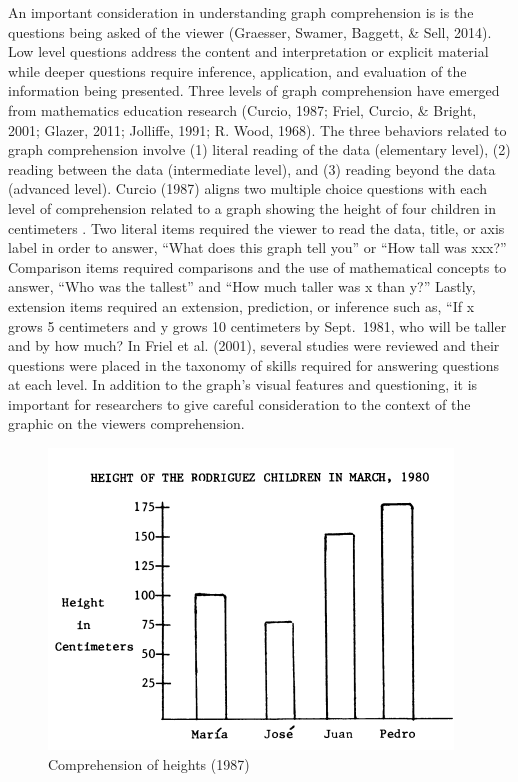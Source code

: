 \documentclass[print]{nuthesis}
\begin{document}
An important consideration in understanding graph comprehension is is the questions being asked of the viewer (Graesser, Swamer, Baggett, \& Sell, 2014).
Low level questions address the content and interpretation or explicit material while deeper questions require inference, application, and evaluation of the information being presented.
Three levels of graph comprehension have emerged from mathematics education research (Curcio, 1987; Friel, Curcio, \& Bright, 2001; Glazer, 2011; Jolliffe, 1991; R. Wood, 1968).
The three behaviors related to graph comprehension involve (1) literal reading of the data (elementary level), (2) reading between the data (intermediate level), and (3) reading beyond the data (advanced level).
Curcio (1987) aligns two multiple choice questions with each level of comprehension related to a graph showing the height of four children in centimeters .
Two literal items required the viewer to read the data, title, or axis label in order to answer, ``What does this graph tell you'' or ``How tall was xxx?''
Comparison items required comparisons and the use of mathematical concepts to answer, ``Who was the tallest'' and ``How much taller was x than y?''
Lastly, extension items required an extension, prediction, or inference such as, ``If x grows 5 centimeters and y grows 10 centimeters by Sept.~1981, who will be taller and by how much?
In Friel et al. (2001), several studies were reviewed and their questions were placed in the taxonomy of skills required for answering questions at each level.
In addition to the graph's visual features and questioning, it is important for researchers to give careful consideration to the context of the graphic on the viewers comprehension.

\begin{figure}[tbp]

{\centering \includegraphics[width=0.8\linewidth,]{images/children-height} 

}

\caption{Comprehension of heights (1987) }\label{fig:children-height}
\end{figure}
\end{document}
